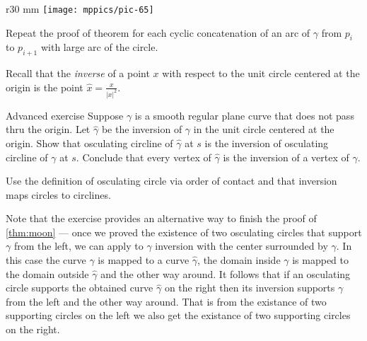 {

\begin{wrapfigure}{r}{30 mm}
\vskip-8mm
\centering
\texttt{[image: mppics/pic-65]}
\vskip0mm
\end{wrapfigure}

Repeat the proof of theorem for each cyclic concatenation of an arc of $\gamma$ from $p_i$ to $p_{i+1}$ with large arc of the circle. 



Recall that the \emph{inverse} of a point $x$ with respect to the unit circle centered at the origin is the point $\hat x=\tfrac{x}{|x|^2}$.

}


\begin{thm}{Advanced exercise}
Suppose $\gamma$ is a smooth regular plane curve that does not pass thru the origin.
Let $\hat \gamma$ be the inversion of $\gamma$ in the unit circle centered at the origin.
Show that osculating circline of $\hat\gamma$ at $s$ is the inversion of osculating circline of $\gamma$ at $s$.
Conclude that every vertex of $\hat\gamma$ is the inversion of a vertex of $\gamma$.
\end{thm}

 Use the definition of osculating circle via order of contact and that inversion maps circles to circlines. 


Note that the exercise provides an alternative way to finish the proof of \ref{thm:moon} --- once we proved the existence of two osculating circles that support $\gamma$ from the left,
we can apply to $\gamma$ inversion with the center surrounded by $\gamma$.
In this case the curve $\gamma$ is mapped to a curve $\hat \gamma$,
the domain inside $\gamma$ is mapped to the domain outside $\hat\gamma$ and the other way around.
It follows that if an osculating circle supports the obtained curve $\hat\gamma$ on the right 
then its inversion supports  $\gamma$ from the left and the other way around.
That is from the existance of two supporting circles on the left we also get the existance of two supporting circles on the right.


